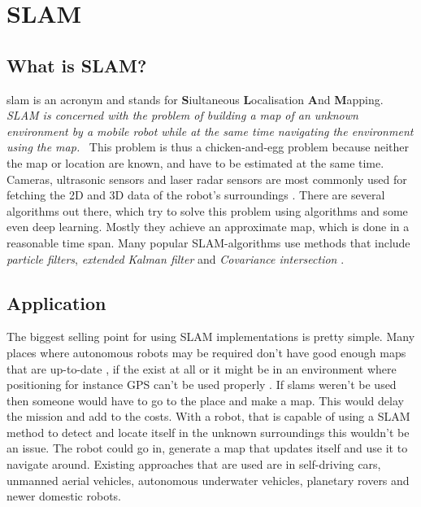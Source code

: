 
\chapter{SLAM\authorA}

\section{What is SLAM?}
\gls{slam} is an acronym and stands for \textbf{S}iultaneous \textbf{L}ocalisation \textbf{A}nd \textbf{M}apping.
\emph{\glqq SLAM is concerned with the problem of building a map of an unknown environment by a mobile robot while at the same time navigating the environment using the map.\grqq}~\cite{slamfordummies} \newline
This problem is thus a chicken-and-egg problem because neither the map or location are known, and have to be estimated at the same time. Cameras, ultrasonic sensors and laser radar sensors are most commonly used for fetching the 2D and 3D data of the robot's surroundings \cite{arreverie}. \newline
There are several algorithms out there, which try to solve this problem using algorithms and some even deep learning. Mostly they achieve an approximate map, which is done in a reasonable time span. Many popular SLAM-algorithms use methods that include \textit{particle filters}, \textit{extended Kalman filter} and \textit{Covariance intersection}\cite{slamfordummies} \cite{1678144}. \newline

\section{Application}
The biggest selling point for using SLAM implementations is pretty simple. Many places where autonomous robots may be required don't have good enough maps that are up-to-date , if the exist at all or it might be in an environment where positioning for instance GPS can't be used properly \cite{techapeekslam}. If slams weren't be used then someone would have to go to the place and make a map. This would delay the mission and add to the costs. \newline
With a robot, that is capable of using a SLAM method to detect and locate itself in the unknown surroundings this wouldn't be an issue. The robot could go in, generate a map that updates itself and use it to navigate around. \newline
Existing approaches that are used are in self-driving cars, unmanned aerial vehicles, autonomous underwater vehicles, planetary rovers and newer domestic robots.


